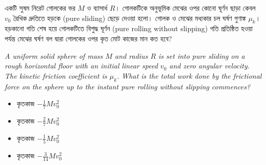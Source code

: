 \documentclass[12pt, a4paper]{article}
\begin{document}
\newpage

\begin{tcolorbox}[questionbox={প্রশ্ন (Question) 26}]
    \noindent
    একটি সুষম নিরেট গোলকের ভর $M$ ও ব্যাসার্ধ $R$। গোলকটিকে অনুভূমিক মেঝের ওপর কোনো ঘূর্ণন ছাড়া কেবল $v_0$ রৈখিক দ্রুতিতে হড়কে (pure sliding) ছেড়ে দেওয়া হলো। গোলক ও মেঝের মধ্যকার চল ঘর্ষণ গুণাঙ্ক $\mu_k$। হড়কানো গতি শেষ হয়ে গোলকটিতে বিশুদ্ধ ঘূর্ণন (pure rolling without slipping) গতি প্রতিষ্ঠিত হওয়া পর্যন্ত মেঝের ঘর্ষণ বল দ্বারা গোলকের ওপর কৃত মোট কাজের মান কত হবে?
    
    \vspace{0.8em}
    \begin{english}
    \noindent\textit{\color{darkgray}
    A uniform solid sphere of mass $M$ and radius $R$ is set into pure sliding on a rough horizontal floor with an initial linear speed $v_0$ and zero angular velocity. The kinetic friction coefficient is $\mu_k$. What is the total work done by the frictional force on the sphere up to the instant pure rolling without slipping commences?
    }
    \end{english}
\end{tcolorbox}

\vspace{1em}
\begin{center}
\end{center}
\vspace{1em}

\begin{itemize}[label={}, leftmargin=1cm, itemsep=0.5em]
    \item[\textbf{A)}] কৃতকাজ $-\frac{1}{7} M v_0^2$
    \item[\textbf{B)}] কৃতকাজ $-\frac{2}{7} M v_0^2$
    \item[\textbf{C)}] কৃতকাজ $-\frac{1}{5} M v_0^2$
    \item[\textbf{D)}] কৃতকাজ $-\frac{3}{14} M v_0^2$
\end{itemize}
\end{document}
